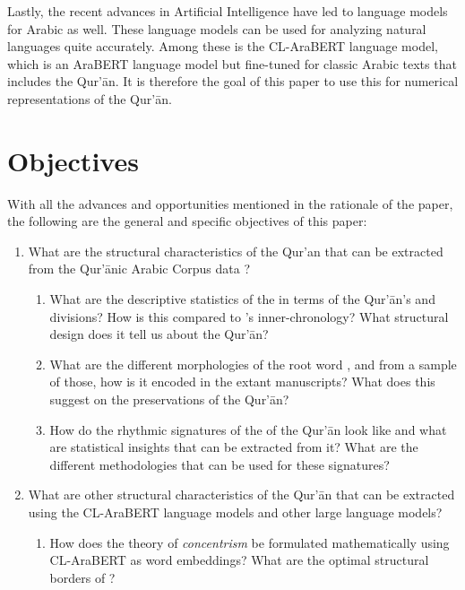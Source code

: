 Lastly, the recent advances in Artificial Intelligence have led to language models for Arabic as well. These language models can be used for analyzing natural languages quite accurately. Among these is the CL-AraBERT language model, which is an AraBERT language model but fine-tuned for classic Arabic texts that includes the Qur'\=an. It is therefore the goal of this paper to use this for numerical representations of the Qur'\=an.
\section{Objectives}\label{sec:objectives}
With all the advances and opportunities mentioned in the rationale of the paper, the following are the general and specific objectives of this paper:
\begin{enumerate}
    \item What are the structural characteristics of the Qur'an that can be extracted from the Qur'\=anic Arabic Corpus data \cite{dukes-habash-2010-morphological}?
    \begin{enumerate}
        \item What are the descriptive statistics of the   in terms of the Qur'\=an's   and   divisions? How is this compared to 's inner-chronology? What structural design does it tell us about the Qur'\=an?
        
        \item What are the different morphologies of the root word  , and from a sample of those, how is it encoded in the extant manuscripts? What does this suggest on the preservations of the Qur'\=an?
        
        \item How do the rhythmic signatures of the   of the Qur'\=an look like and what are statistical insights that can be extracted from it? What are the different methodologies that can be used for these signatures?

    \end{enumerate}
    
    \item What are other structural characteristics of the Qur'\=an that can be extracted using the CL-AraBERT language models and other large language models?
    \begin{enumerate}
        \item How does the theory of \textit{concentrism} be formulated mathematically using CL-AraBERT as word embeddings? What are the optimal structural borders of  ?
        

\end{enumerate}
\end{enumerate}
